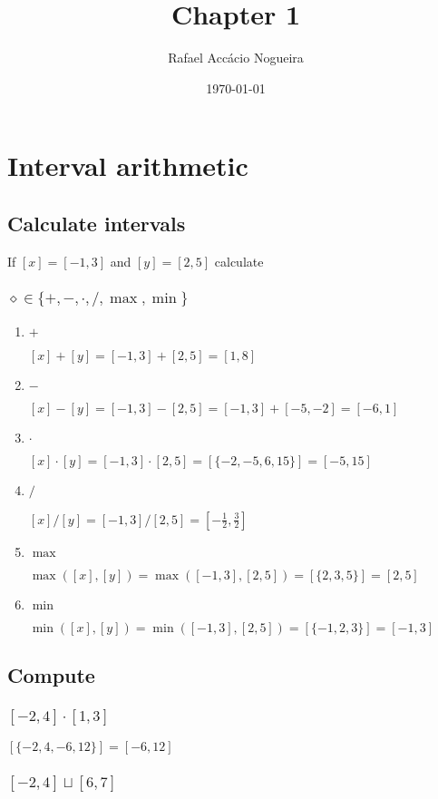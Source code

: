 \documentclass[11pt]{article}
\author{Rafael Accácio Nogueira}
\date{\today}
\title{Chapter 1}
\begin{document}
\maketitle

\section{Interval arithmetic}
\label{sec:org77b41f1}
\subsection{Calculate intervals}
\label{sec:org7651090}
If \([x]=[-1,3]\) and \([y]=[2,5]\) calculate
\subsubsection{\(\diamond\in\{+,-,\cdot,/,\max,\min\}\)}
\label{sec:org84e40ec}
\begin{enumerate}
\item \(+\)
\label{sec:orgaf5a3fd}

\([x]+[y]=[-1,3]+[2,5]=[1,8]\)
\item \(-\)
\label{sec:orgc244e19}

\([x]-[y]=[-1,3]-[2,5]=[-1,3]+[-5,-2]=[-6,1]\)
\item \(\cdot\)
\label{sec:org0a9e441}


\([x]\cdot[y]=[-1,3]\cdot[2,5]=[\{-2,-5,6,15\}]=[-5,15]\)
\item \(/\)
\label{sec:orgcc3f623}

\([x]/[y]=[-1,3]/[2,5]=[-\frac{1}{2},\frac{3}{2}]\)
\item \(\max\)
\label{sec:org5e7cf01}


\(\max([x],[y])=\max([-1,3],[2,5])=[\{2,3,5\}]=[2,5]\)
\item \(\min\)
\label{sec:org1b7a9e3}

\(\min([x],[y])=\min([-1,3],[2,5])=[\{-1,2,3\}]=[-1,3]\)
\end{enumerate}
\subsection{Compute}
\label{sec:orga345726}
\subsubsection{\([-2,4]\cdot[1,3]\)}
\label{sec:orgc0af468}

\([\{-2,4,-6,12\}]=[-6,12]\)
\subsubsection{\([-2,4]\sqcup [6,7]\)}
\label{sec:org0a5e499}
\end{document}

